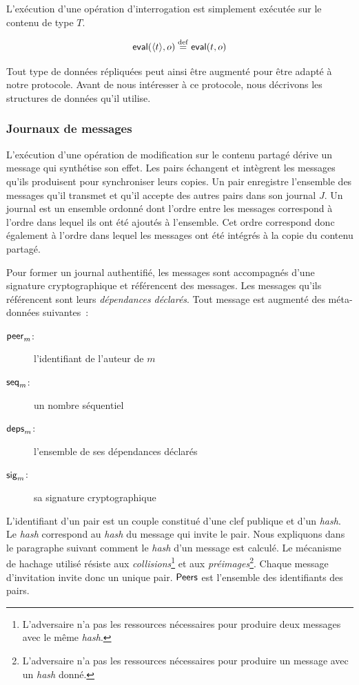 L'exécution d'une opération d'interrogation est simplement exécutée sur le contenu de type $T$.

\begin{equation*}
    \trm{eval}(\tuple*{t}, o) \defeq \trm{eval}(t, o)
\end{equation*}

Tout type de données répliquées peut ainsi être augmenté pour être adapté à notre protocole.
Avant de nous intéresser à ce protocole, nous décrivons les structures de données qu'il utilise.

\subsubsection{Journaux de messages}

L'exécution d'une opération de modification sur le contenu partagé dérive un message qui synthétise son effet.
Les pairs échangent et intègrent les messages qu'ils produisent pour synchroniser leurs copies.
Un pair enregistre l’ensemble des messages qu'il transmet et qu'il accepte des autres pairs dans son journal $J$.
Un journal est un ensemble ordonné dont l'ordre entre les messages correspond à l'ordre dans lequel ils ont été ajoutés à l'ensemble.
Cet ordre correspond donc également à l'ordre dans lequel les messages ont été intégrés à la copie du contenu partagé.

Pour former un journal authentifié, les messages sont accompagnés d'une signature cryptographique et référencent des messages.
Les messages qu'ils référencent sont leurs \emph{dépendances déclarés}.
Tout message est augmenté des méta-données suivantes~:
\begin{description}
    \item[$\operatorname{\mathsf{peer}}_m$:] l'identifiant de l'auteur de $m$ 
    \item[$\operatorname{\mathsf{seq}}_m$:] un nombre séquentiel
    \item[$\operatorname{\mathsf{deps}}_m$:] l'ensemble de ses dépendances déclarés
    \item[$\operatorname{\mathsf{sig}}_m$:] sa signature cryptographique 
\end{description}

L'identifiant d'un pair est un couple constitué d'une clef publique et d'un \emph{hash}.
Le \emph{hash} correspond au \emph{hash} du message qui invite le pair.
Nous expliquons dans le paragraphe suivant comment le \emph{hash} d'un message est calculé.
Le mécanisme de hachage utilisé résiste aux \emph{collisions}\footnote{L'adversaire n'a pas les ressources nécessaires pour produire deux messages avec le même \emph{hash}.} et aux \emph{préimages}\footnote{L'adversaire n'a pas les ressources nécessaires pour produire un message avec un \emph{hash} donné.}.
Chaque message d'invitation invite donc un unique pair.
$\operatorname{\mathsf{Peers}}$ est l'ensemble des identifiants des pairs.

